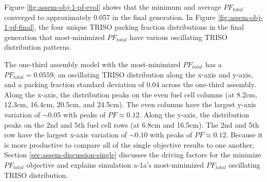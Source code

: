 Figure \ref{fig:assem-obj-1-pf-evol} shows that the minimum and average $PF_{total}$ 
converged to approximately 0.057 in the final generation. 
In Figure \ref{fig:assem-obj-1-pf-final}, the four unique TRISO packing fraction 
distributions in the final generation that most-minimized $PF_{total}$ have various 
oscillating TRISO distribution patterns. 

The one-third assembly model with the most-minimized $PF_{total}$ has a 
$PF_{total} =0.0559$, an oscillating TRISO distribution along the 
x-axis and y-axis, and a packing fraction standard deviation of $0.04$ across the 
one-third assembly. 
Along the x-axis, the distribution peaks on the even fuel cell columns (at 8.2cm, 12.3cm, 
16.4cm, 20.5cm, and 24.5cm). 
The even columns have the largest y-axis variation of ${\sim}0.05$ with peaks of
$PF\approx0.12$.
Along the y-axis, the distribution peaks on the 2nd and 5th fuel cell rows (at 6.8cm and 
16.5cm).
The 2nd and 5th row have the largest x-axis variation of ${\sim}0.10$ with peaks of 
$PF\approx0.12$. 
Because it is more productive to compare all of the single objective results to one 
another, Section \ref{sec:assem-discussion-single} discusses the driving factors for
the minimize $PF_{total}$ objective and explains simulation a-1a's most-minimized 
$PF_{total}$ oscillating TRISO distribution. 

